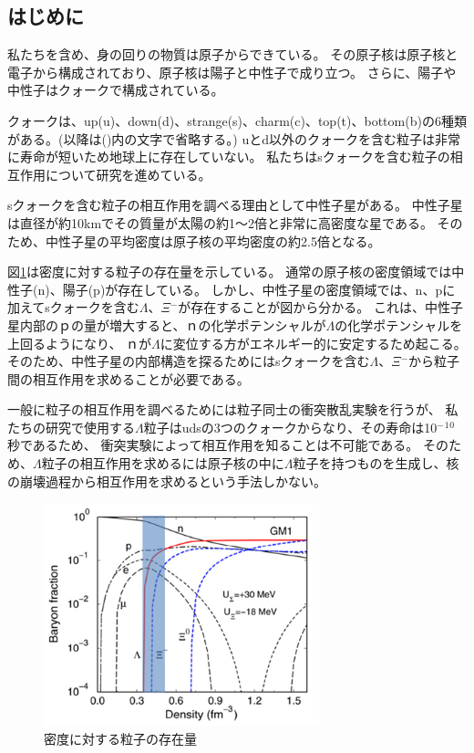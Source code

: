 \documentclass[12pt,a4paper]{jarticle}
\begin{document}
\subsection{はじめに}
私たちを含め、身の回りの物質は原子からできている。
その原子核は原子核と電子から構成されており、原子核は陽子と中性子で成り立つ。
さらに、陽子や中性子はクォークで構成されている。
\par
クォークは、up(u)、down(d)、strange(s)、charm(c)、top(t)、bottom(b)の6種類がある。(以降は()内の文字で省略する。)
uとd以外のクォークを含む粒子は非常に寿命が短いため地球上に存在していない。
私たちはsクォークを含む粒子の相互作用について研究を進めている。
\par
sクォークを含む粒子の相互作用を調べる理由として中性子星がある。
中性子星は直径が約10kmでその質量が太陽の約1～2倍と非常に高密度な星である。
そのため、中性子星の平均密度は原子核の平均密度の約2.5倍となる。
\par
図\ref{fig:den_barion}は密度に対する粒子の存在量を示している。
通常の原子核の密度領域では中性子(n)、陽子(p)が存在している。
しかし、中性子星の密度領域では、n、pに加えてsクォークを含む$\Lambda$、$\Xi$$^-$が存在することが図から分かる。
これは、中性子星内部のｐの量が増大すると、ｎの化学ポテンシャルが$\Lambda$の化学ポテンシャルを上回るようになり、
ｎが$\Lambda$に変位する方がエネルギー的に安定するため起こる。
そのため、中性子星の内部構造を探るためにはsクォークを含む$\Lambda$、$\Xi$$^-$から粒子間の相互作用を求めることが必要である。
\par
一般に粒子の相互作用を調べるためには粒子同士の衝突散乱実験を行うが、
私たちの研究で使用する$\Lambda$粒子はudsの3つのクォークからなり、その寿命は10$^-$$^1$$^0$秒であるため、
衝突実験によって相互作用を知ることは不可能である。
そのため、$\Lambda$粒子の相互作用を求めるには原子核の中に$\Lambda$粒子を持つものを生成し、核の崩壊過程から相互作用を求めるという手法しかない。
\begin{figure}[htbp]
  \centering
   \includegraphics[width=80mm]{den_barion.png}
  \caption{密度に対する粒子の存在量\label{fig:den_barion}}
\end{figure}
\end{document}
